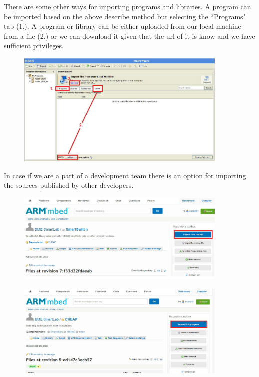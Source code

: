 \documentclass[a4paper]{article}
\begin{document}
There are some other ways for importing programs and libraries. A program can be imported based on the above describe method but selecting the ``Programs" tab (1.).
A program or library can be either uploaded from our local machine from a file (2.) or we can download it given that the url of it is know and we have sufficient privileges.

\begin{figure}[H]
    \centering
    \includegraphics[width=0.9\textwidth]{figures/mbed-import2.png}
\end{figure}

In case if we are a part of a development team there is an option for importing the sources published by other developers.

\begin{figure}[H]
    \centering
    \includegraphics[width=0.9\textwidth]{figures/mbed-online-import.png}
\end{figure}
\begin{figure}[H]
    \centering
    \includegraphics[width=0.9\textwidth]{figures/mbed-online-import2.png}
\end{figure}
\end{document}

